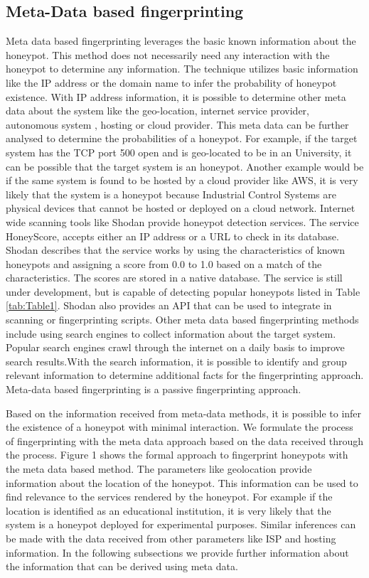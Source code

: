 \documentclass[letterpaper, 10 pt, conference]{ieeeconf}  %
\begin{document}
\subsection{Meta-Data based fingerprinting}
Meta data based fingerprinting leverages the basic known information about the honeypot. This method does not necessarily need any interaction with the honeypot to determine any information. The technique utilizes basic information like the IP address or the domain name to infer the probability of honeypot existence. With IP address information, it is possible to determine other meta data about the system like the geo-location, internet service provider, autonomous system , hosting or cloud provider. This meta data can be further analysed to determine the probabilities of a honeypot. For example, if the target system has the TCP port 500 open and is geo-located to be in an University, it can be possible that the target system is an honeypot. Another example would be if the same system is found to be hosted by a cloud provider like AWS, it is very likely that the system is a honeypot because Industrial Control Systems are physical devices that cannot be hosted or deployed on a cloud network.
Internet wide scanning tools like Shodan provide honeypot detection services. The service HoneyScore, accepts either an IP address or a URL to check in its database. Shodan describes that the service works by using the characteristics of known honeypots and assigning a score from 0.0 to 1.0 based on a match of the characteristics. The scores are stored in a native database. The service is still under development, but is capable of detecting popular honeypots listed in Table \ref{tab:Table1}. Shodan also provides an API that can be used to integrate in scanning or fingerprinting scripts. Other meta data based fingerprinting methods include using search engines to collect information about the target system. Popular search engines crawl through the internet on a daily basis to improve search results.With the search information, it is possible to identify and group relevant information to determine additional facts for the fingerprinting approach. Meta-data based fingerprinting is a passive fingerprinting approach.


Based on the information received from meta-data methods, it is possible to infer the existence of a honeypot with minimal interaction. We formulate the process of fingerprinting with the meta data approach based on the data received through the process. Figure 1 shows the formal approach to fingerprint honeypots with the meta data based method. The parameters like geolocation provide information about the location of the honeypot. This information can be used to find relevance to the services rendered by the honeypot. For example if the location is identified as an educational institution, it is very likely that the system is a honeypot deployed for experimental purposes. Similar inferences can be made with the data received from other parameters like ISP and hosting information. In the following subsections we provide further information about the information that can be derived using meta data. 
\newline
\end{document}
